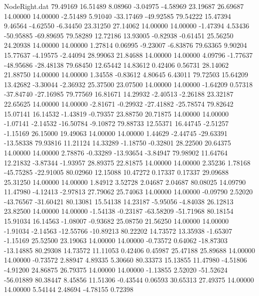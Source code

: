 \begin{filecontents}{NodeRight.dat}
  79.49169   16.51489    8.08960    -3.04975   -4.58969   23.19687   26.69687   14.00000   14.00000   -2.51489    5.91040  -33.17469  -49.92585
  79.54222   15.47394    9.46564    -4.62550   -6.34450   23.31250   27.14062   14.00000   14.00000   -1.47394    4.53436  -50.95885  -69.89695
  79.58289   12.72186   13.93005    -0.82938   -0.61451   25.56250   24.20938   14.00000   14.00000    1.27814    0.06995   -9.23007   -6.83876
  79.63365    9.90204   15.77637    -4.19575   -2.44094   28.99063   21.84688   14.00000   14.00000    4.09796   -1.77637  -48.95686  -28.48138
  79.68450   12.65442   14.83612     0.42406    0.56731   28.14062   21.88750   14.00000   14.00000    1.34558   -0.83612    4.80645    6.43011
  79.72503   15.64209   13.42682    -3.30044   -2.36932   25.37500   23.07500   14.00000   14.00000   -1.64209    0.57318  -37.84740  -27.16985
  79.77569   16.81671   14.29932    -2.40513   -2.26188   23.32187   22.65625   14.00000   14.00000   -2.81671   -0.29932  -27.41882  -25.78574
  79.82642   15.07141   16.14532    -1.43819   -0.79357   23.88750   20.71875   14.00000   14.00000   -1.07141   -2.14532  -16.50784   -9.10872
  79.88733   12.55371   16.44745    -2.51257   -1.15169   26.15000   19.49063   14.00000   14.00000    1.44629   -2.44745  -29.63391  -13.58338
  79.93816   11.21124   14.33289    -1.18750   -0.32801   28.22500   20.64375   14.00000   14.00000    2.78876   -0.33289  -13.93654   -3.84947
  79.98902   11.64764   12.21832    -3.87344   -1.93957   28.89375   22.81875   14.00000   14.00000    2.35236    1.78168  -45.75285  -22.91005
  80.02960   12.15088   10.47272     0.17337    0.17337   29.09688   25.31250   14.00000   14.00000    1.84912    3.52728    2.04687    2.04687
  80.08025   14.09790   11.47980    -4.12413   -2.97813   27.79062   25.74063   14.00000   14.00000   -0.09790    2.52020  -43.76567  -31.60421
  80.13081   15.54138   14.23187    -5.95056   -4.84038   26.12813   23.82500   14.00000   14.00000   -1.54138   -0.23187  -63.58209  -51.71968
  80.18154   15.91034   16.14563    -1.08007   -0.93682   25.08750   21.56250   14.00000   14.00000   -1.91034   -2.14563  -12.55766  -10.89213
  80.22202   14.73572   13.35938    -1.65307   -1.15169   25.52500   23.19063   14.00000   14.00000   -0.73572    0.64062  -18.87303  -13.14885
  80.29308   14.73572   11.11053     0.42406    0.45987   25.47188   25.89688   14.00000   14.00000   -0.73572    2.88947    4.89335    5.30660
  80.33373   15.13855   11.47980    -4.51806   -4.91200   24.86875   26.79375   14.00000   14.00000   -1.13855    2.52020  -51.52624  -56.01889
  80.38447    8.45856   11.51306    -0.43544    0.06593   30.65313   27.49375   14.00000   14.00000    5.54144    2.48694   -4.78155    0.72398

\end{filecontents}
